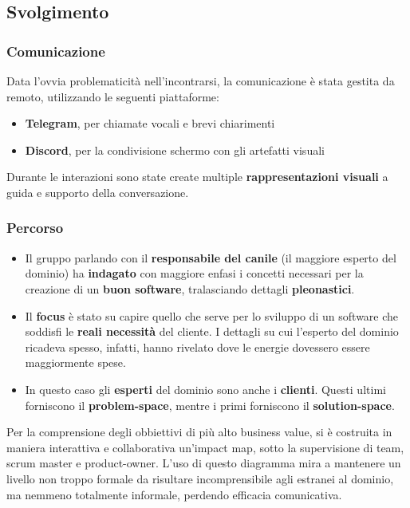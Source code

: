     \subsection{Svolgimento}
    \subsubsection{Comunicazione}
	Data l'ovvia problematicità nell'incontrarsi, la comunicazione è stata gestita da remoto, utilizzando le seguenti piattaforme:
	\begin{itemize}
	    \item \textbf{Telegram}, per chiamate vocali e brevi chiarimenti
	    \item \textbf{Discord}, per la condivisione schermo con gli artefatti visuali
	\end{itemize}
	Durante le interazioni sono state create multiple \textbf{rappresentazioni visuali} a guida e supporto della conversazione. 
	
	\subsubsection{Percorso}
	\begin{itemize}
	    \item Il gruppo parlando con il \textbf{responsabile del canile} (il maggiore esperto del dominio) ha \textbf{indagato} con maggiore enfasi i concetti necessari per la creazione di un \textbf{buon software}, tralasciando dettagli \textbf{pleonastici}. 
	    \item Il \textbf{focus} è stato su capire quello che serve per lo sviluppo di un software che soddisfi le \textbf{reali necessità} del cliente. I dettagli su cui l'esperto del dominio ricadeva spesso, infatti, hanno rivelato dove le energie dovessero essere maggiormente spese. 
	    \item In questo caso gli \textbf{esperti} del dominio sono anche i \textbf{clienti}. Questi ultimi forniscono il \textbf{problem-space}, mentre i primi forniscono il \textbf{solution-space}.
	    \end{itemize}
	
	Per la comprensione degli obbiettivi di più alto business value, si è costruita in maniera interattiva e collaborativa un'impact map, sotto la supervisione di team, scrum master e product-owner. L'uso di questo diagramma mira a mantenere un livello non troppo formale da risultare incomprensibile agli estranei al dominio, ma nemmeno totalmente informale, perdendo efficacia comunicativa. 
	
